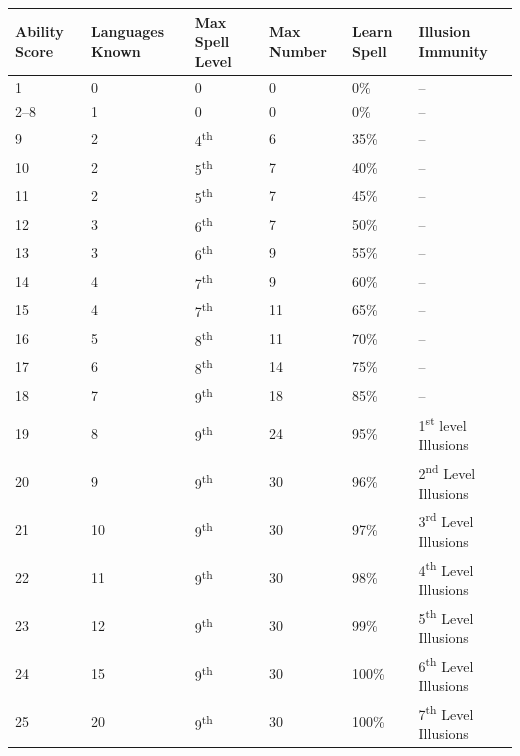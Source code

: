 \noindent
\begin{minipage}{\columnwidth}

\label{intelligencescores}
\noindent
\begin{tabular}{|m{}|m{}|m{}|m{}|m{}|m{}|}
\hline
Ability Score	& Languages Known	& Max Spell Level	& Max Number	& Learn Spell	& Illusion Immunity \\
\hline\hline
\rowcolor[gray]{.9}1	& 0		& 0		& 0		& 0\%	& -- \\ 
2--8	& 1		& 0		& 0		& 0\%	& -- \\
\rowcolor[gray]{.9}9	& 2		& 4\textsuperscript{th}	& 6		& 35\%	& -- \\
10	& 2		& 5\textsuperscript{th}	& 7		& 40\%	& -- \\
\rowcolor[gray]{.9}11	& 2		& 5\textsuperscript{th}	& 7		& 45\%	& -- \\
12	& 3		& 6\textsuperscript{th}	& 7		& 50\%	& -- \\
\rowcolor[gray]{.9}13	& 3		& 6\textsuperscript{th}	& 9		& 55\%	& -- \\
14	& 4		& 7\textsuperscript{th}	& 9		& 60\%	& -- \\
\rowcolor[gray]{.9}15	& 4		& 7\textsuperscript{th}	& 11	& 65\%	& -- \\
16	& 5		& 8\textsuperscript{th}	& 11	& 70\%	& -- \\
\rowcolor[gray]{.9}17	& 6		& 8\textsuperscript{th}	& 14	& 75\%	& -- \\
18	& 7		& 9\textsuperscript{th}	& 18	& 85\%	& -- \\
\rowcolor[gray]{.9}19	& 8		& 9\textsuperscript{th}	& 24	& 95\%	& 1\textsuperscript{st} level Illusions \\
20	& 9		& 9\textsuperscript{th}	& 30	& 96\%	& 2\textsuperscript{nd} Level Illusions \\
\rowcolor[gray]{.9}21	& 10	& 9\textsuperscript{th}	& 30	& 97\%	& 3\textsuperscript{rd} Level Illusions \\
22	& 11	& 9\textsuperscript{th}	& 30	& 98\%	& 4\textsuperscript{th} Level Illusions \\
\rowcolor[gray]{.9}23	& 12	& 9\textsuperscript{th}	& 30	& 99\%	& 5\textsuperscript{th} Level Illusions \\
24	& 15	& 9\textsuperscript{th}	& 30	& 100\%	& 6\textsuperscript{th} Level Illusions \\
\rowcolor[gray]{.9}25	& 20	& 9\textsuperscript{th}	& 30	& 100\%	& 7\textsuperscript{th} Level Illusions \\
\hline
\end{tabular}

\end{minipage}

